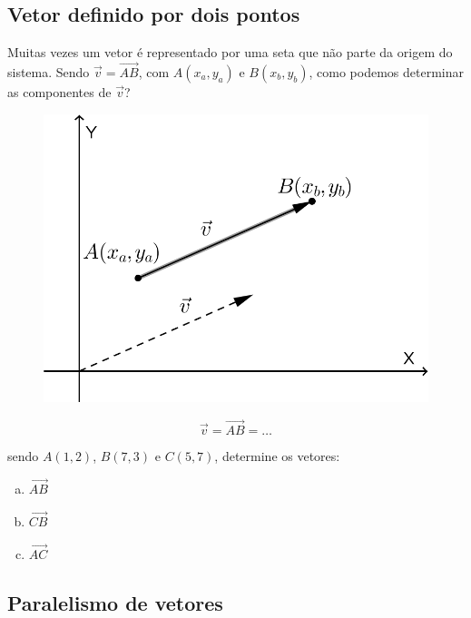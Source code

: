 \subsection{Vetor definido por dois pontos}

Muitas vezes um vetor é representado por uma seta que não parte da origem do sistema. Sendo $\vec{v}=\overrightarrow{AB}$, com $A(x_a, y_a)$ e $B(x_b, y_b)$, como podemos determinar as componentes de $\vec{v}$?

\begin{multicols}{2}
\begin{figure}[H]
\centering
\includegraphics[scale=0.87]{analitica/imagens/doispontos.png}
\end{figure}

$$\vec{v}=\overrightarrow{AB}=\ldots$$
\end{multicols}


\begin{exemplo} sendo $A(1, 2)$, $B(7, 3)$ e $C(5, 7)$, determine os vetores:
\begin{enumerate}[a)]
 \item $\overrightarrow{AB}$
 \item $\overrightarrow{CB}$
 \item $\overrightarrow{AC}$
\end{enumerate}
\end{exemplo}

\subsection{Paralelismo de vetores}

